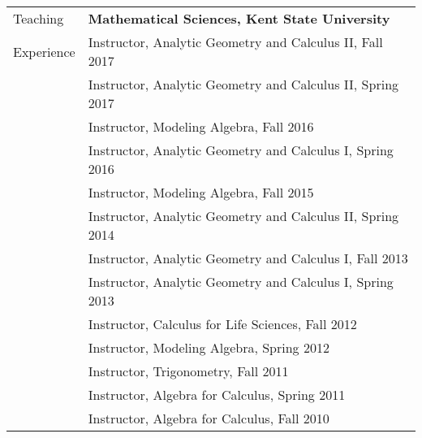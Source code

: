 \documentclass[letterpaper,10pt,oneside]{article}
\begin{document}
\noindent \begin{tabular}{@{} l l}
 \Large{Teaching} & \textbf{Mathematical Sciences, Kent State University} \\
 \Large{Experience} & Instructor, Analytic Geometry and Calculus II, Fall 2017 \\
 \hspace{1.1in} & Instructor, Analytic Geometry and Calculus II, Spring 2017 \\
 & Instructor, Modeling Algebra, Fall 2016 \\
 & Instructor, Analytic Geometry and Calculus I, Spring 2016 \\
 & Instructor, Modeling Algebra, Fall 2015 \\
 & Instructor, Analytic Geometry and Calculus II, Spring 2014 \\
 & Instructor, Analytic Geometry and Calculus I, Fall 2013 \\
 & Instructor, Analytic Geometry and Calculus I, Spring 2013 \\
 & Instructor, Calculus for Life Sciences, Fall 2012 \\
 & Instructor, Modeling Algebra, Spring 2012 \\
 & Instructor, Trigonometry, Fall 2011 \\
 & Instructor, Algebra for Calculus, Spring 2011 \\
 & Instructor, Algebra for Calculus, Fall 2010 \\
\end{tabular}
\end{document}
